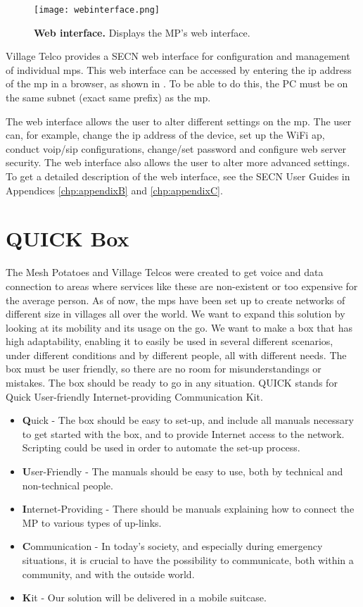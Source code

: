 \begin{figure}[t]
  \centering
      \texttt{[image: webinterface.png]}
  \caption [Web interface]{\textbf{Web interface.} Displays the MP's web interface.}
  \label{fig:webinterface}
\end{figure}

Village Telco provides a SECN web interface for configuration and management of individual \glspl{mp}. This web interface can be accessed by entering the \gls{ip} address of the \gls{mp} in a browser, as shown in . To be able to do this, the PC must be on the same subnet (exact same prefix) as the \gls{mp}.    

The web interface allows the user to alter different settings on the \gls{mp}. The user can, for example, change the \gls{ip} address of the device, set up the WiFi \gls{ap}, conduct \gls{voip}/\gls{sip} configurations, change/set password and configure web server security. The web interface also allows the user to alter more advanced settings. To get a detailed description of the web interface, see the SECN User Guides in Appendices \ref{chp:appendixB} and \ref{chp:appendixC}.



\section{QUICK Box}
The Mesh Potatoes and Village Telcos were created to get voice and data connection to areas where services like these are non-existent or too expensive for the average person. As of now, the \glspl{mp} have been set up to create networks of different size in villages all over the world. We want to expand this solution by looking at its mobility and its usage on the go. We want to make a box that has high adaptability, enabling it to easily be used in several different scenarios, under different conditions and by different people, all with different needs. The box must be user friendly, so there are no room for misunderstandings or mistakes. The box should be ready to go in any situation. QUICK stands for Quick User-friendly Internet-providing Communication Kit. 

\begin{itemize}
\item [] \textbf{Q}uick - The box should be easy to set-up, and include all manuals necessary to get started with the box, and to provide Internet access to the network. Scripting could be used in order to automate the set-up process. 
\item [] \textbf{U}ser-Friendly - The manuals should be easy to use, both by technical and non-technical people. 
\item [] \textbf{I}nternet-Providing - There should be manuals explaining how to connect the MP to various types of up-links. 
\item [] \textbf{C}ommunication - In today's society, and especially during emergency situations, it is crucial to have the possibility to communicate, both within a community, and with the outside world.
\item [] \textbf{K}it - Our solution will be delivered in a mobile suitcase. 
\end{itemize}

